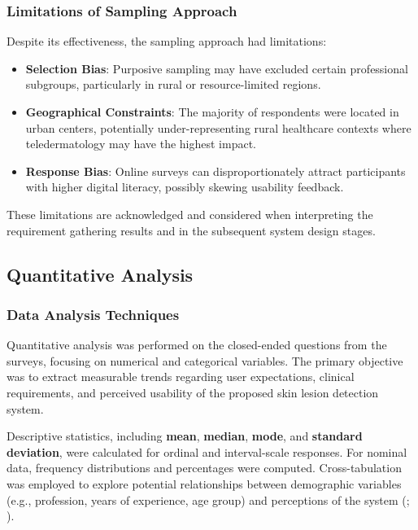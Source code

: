 \documentclass[
  12pt,
  oneside]{article}
\providecommand{\tightlist}{%
  \setlength{\itemsep}{0pt}\setlength{\parskip}{0pt}}
\begin{document}
\subsubsection{Limitations of Sampling
Approach}\label{limitations-of-sampling-approach}

Despite its effectiveness, the sampling approach had limitations:

\begin{itemize}
\tightlist
\item
  \textbf{Selection Bias}: Purposive sampling may have excluded certain
  professional subgroups, particularly in rural or resource-limited
  regions.
\item
  \textbf{Geographical Constraints}: The majority of respondents were
  located in urban centers, potentially under-representing rural
  healthcare contexts where teledermatology may have the highest impact.
\item
  \textbf{Response Bias}: Online surveys can disproportionately attract
  participants with higher digital literacy, possibly skewing usability
  feedback.
\end{itemize}

These limitations are acknowledged and considered when interpreting the
requirement gathering results and in the subsequent system design
stages.

\subsection{Quantitative Analysis}\label{quantitative-analysis}

\subsubsection{Data Analysis Techniques}\label{data-analysis-techniques}

Quantitative analysis was performed on the closed-ended questions from
the surveys, focusing on numerical and categorical variables. The
primary objective was to extract measurable trends regarding user
expectations, clinical requirements, and perceived usability of the
proposed skin lesion detection system.

Descriptive statistics, including \textbf{mean}, \textbf{median},
\textbf{mode}, and \textbf{standard deviation}, were calculated for
ordinal and interval-scale responses. For nominal data, frequency
distributions and percentages were computed. Cross-tabulation was
employed to explore potential relationships between demographic
variables (e.g., profession, years of experience, age group) and
perceptions of the system (;
).
\end{document}
